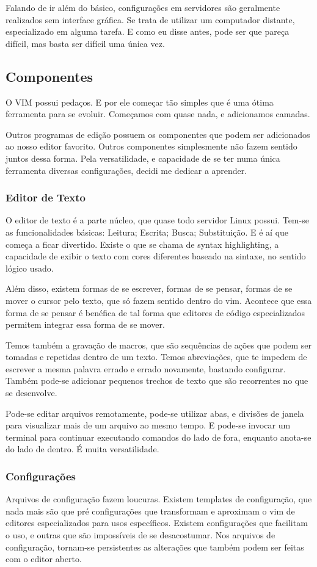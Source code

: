 \documentclass[a4paper, 12pt]{article}
\begin{document}
Falando de ir além do básico, configurações em servidores são geralmente realizados sem interface gráfica.
Se trata de utilizar um computador distante, especializado em alguma tarefa.
E como eu disse antes, pode ser que pareça difícil, mas basta ser difícil uma única vez.

\subsection{Componentes}
O VIM possui pedaços.
E por ele começar tão simples que é uma ótima ferramenta para se evoluir.
Começamos com quase nada, e adicionamos camadas.

Outros programas de edição possuem os componentes que podem ser adicionados ao nosso editor favorito.
Outros componentes simplesmente não fazem sentido juntos dessa forma.
Pela versatilidade, e capacidade de se ter numa única ferramenta diversas configurações, decidi me dedicar a aprender.

\subsubsection{Editor de Texto}
O editor de texto é a parte núcleo, que quase todo servidor Linux possui.
Tem-se as funcionalidades básicas: Leitura; Escrita; Busca; Substituição.
E é aí que começa a ficar divertido.
Existe o que se chama de syntax highlighting, a capacidade de exibir o texto
com cores diferentes baseado na sintaxe, no sentido lógico usado.

Além disso, existem formas de se escrever, formas de se pensar, formas de se
mover o cursor pelo texto, que só fazem sentido dentro do vim.
Acontece que essa forma de se pensar é benéfica de tal forma que
editores de código especializados permitem integrar essa forma de se mover.

Temos também a gravação de macros, que são sequências de ações que podem ser tomadas e repetidas dentro de um texto.
Temos abreviações, que te impedem de escrever a mesma palavra errado e errado novamente, bastando configurar.
Também pode-se adicionar pequenos trechos de texto que são recorrentes no que se desenvolve.

Pode-se editar arquivos remotamente, pode-se utilizar abas,
e divisões de janela para visualizar mais de um arquivo ao mesmo tempo.
E pode-se invocar um terminal para continuar executando comandos do lado de fora, enquanto anota-se do lado de dentro.
É muita versatilidade.

\subsubsection{Configurações}
Arquivos de configuração fazem loucuras.
Existem templates de configuração, que nada mais são que pré configurações
que transformam e aproximam o vim de editores especializados para usos específicos.
Existem configurações que facilitam o uso, e outras que são impossíveis de se desacostumar.
Nos arquivos de configuração, tornam-se persistentes as alterações que também podem ser feitas com o editor aberto.
\end{document}
